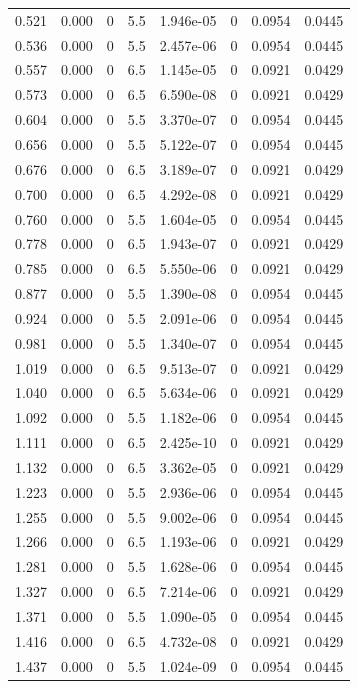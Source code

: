 \documentclass[preview]{standalone}
\begin{document}
{{\begin{tabular}{L{1.2cm}C{1.2cm} C{0.3cm}C{0.5cm} C{1.4cm}C{1.4cm} C{1.4cm}C{1.4cm}}
  0.521  &  0.000  & 0     & 5.5 &  1.946e-05  & 0  & 0.0954 &  0.0445   \\ 
  0.536  &  0.000  & 0     & 5.5 &  2.457e-06  & 0  & 0.0954 &  0.0445   \\ 
  0.557  &  0.000  & 0     & 6.5 &  1.145e-05  & 0  & 0.0921 &  0.0429   \\ 
  0.573  &  0.000  & 0     & 6.5 &  6.590e-08  & 0  & 0.0921 &  0.0429   \\ 
  0.604  &  0.000  & 0     & 5.5 &  3.370e-07  & 0  & 0.0954 &  0.0445   \\ 
  0.656  &  0.000  & 0     & 5.5 &  5.122e-07  & 0  & 0.0954 &  0.0445   \\ 
  0.676  &  0.000  & 0     & 6.5 &  3.189e-07  & 0  & 0.0921 &  0.0429   \\ 
  0.700  &  0.000  & 0     & 6.5 &  4.292e-08  & 0  & 0.0921 &  0.0429   \\ 
  0.760  &  0.000  & 0     & 5.5 &  1.604e-05  & 0  & 0.0954 &  0.0445   \\ 
  0.778  &  0.000  & 0     & 6.5 &  1.943e-07  & 0  & 0.0921 &  0.0429   \\ 
  0.785  &  0.000  & 0     & 6.5 &  5.550e-06  & 0  & 0.0921 &  0.0429   \\ 
  0.877  &  0.000  & 0     & 5.5 &  1.390e-08  & 0  & 0.0954 &  0.0445   \\ 
  0.924  &  0.000  & 0     & 5.5 &  2.091e-06  & 0  & 0.0954 &  0.0445   \\ 
  0.981  &  0.000  & 0     & 5.5 &  1.340e-07  & 0  & 0.0954 &  0.0445   \\ 
  1.019  &  0.000  & 0     & 6.5 &  9.513e-07  & 0  & 0.0921 &  0.0429   \\ 
  1.040  &  0.000  & 0     & 6.5 &  5.634e-06  & 0  & 0.0921 &  0.0429   \\ 
  1.092  &  0.000  & 0     & 5.5 &  1.182e-06  & 0  & 0.0954 &  0.0445   \\ 
  1.111  &  0.000  & 0     & 6.5 &  2.425e-10  & 0  & 0.0921 &  0.0429   \\ 
  1.132  &  0.000  & 0     & 6.5 &  3.362e-05  & 0  & 0.0921 &  0.0429   \\ 
  1.223  &  0.000  & 0     & 5.5 &  2.936e-06  & 0  & 0.0954 &  0.0445   \\ 
  1.255  &  0.000  & 0     & 5.5 &  9.002e-06  & 0  & 0.0954 &  0.0445   \\ 
  1.266  &  0.000  & 0     & 6.5 &  1.193e-06  & 0  & 0.0921 &  0.0429   \\ 
  1.281  &  0.000  & 0     & 5.5 &  1.628e-06  & 0  & 0.0954 &  0.0445   \\ 
  1.327  &  0.000  & 0     & 6.5 &  7.214e-06  & 0  & 0.0921 &  0.0429   \\ 
  1.371  &  0.000  & 0     & 5.5 &  1.090e-05  & 0  & 0.0954 &  0.0445   \\ 
  1.416  &  0.000  & 0     & 6.5 &  4.732e-08  & 0  & 0.0921 &  0.0429   \\ 
  1.437  &  0.000  & 0     & 5.5 &  1.024e-09  & 0  & 0.0954 &  0.0445   \\ 
\hline 
\end{tabular} 

}}
\end{document}
